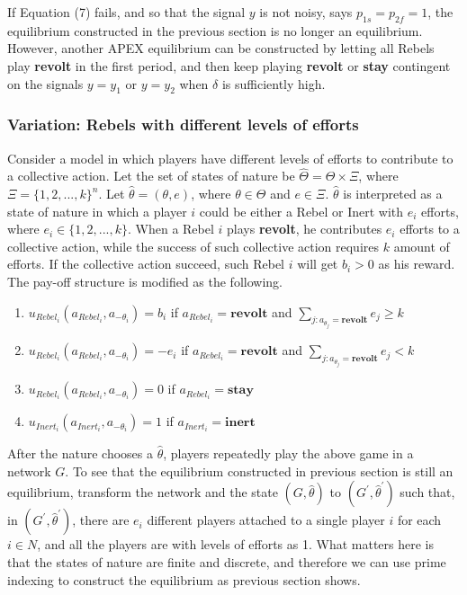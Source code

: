 \documentclass[12pt,letter]{article}
\theoremstyle{definition}
\theoremstyle{remark}
\theoremstyle{claim}
\begin{document}
If Equation (7) fails, and so that the signal $y$ is not noisy, says $p_{1s}=p_{2f}=1$, the equilibrium constructed in the previous section is no longer an equilibrium. However, another APEX equilibrium can be constructed by letting all Rebels play \textbf{revolt} in the first period, and then keep playing \textbf{revolt} or \textbf{stay} contingent on the signals $y=y_1$ or $y=y_2$ when $\delta$ is sufficiently high.

\subsubsection{Variation: Rebels with different levels of efforts}

Consider a model in which players have different levels of efforts to contribute to a collective action. Let the set of states of nature be $\hat{\Theta}=\Theta \times \Xi$, where $\Xi=\{1,2,...,k\}^n$. Let $\hat{\theta}=(\theta,e)$, where $\theta\in \Theta$ and $e\in \Xi$. $\hat{\theta}$ is interpreted as a state of nature in which a player $i$ could be either a Rebel or Inert with $e_i$ efforts, where $e_i\in \{1,2,...,k\}$. When a Rebel $i$ plays \textbf{revolt}, he contributes $e_i$ efforts to a collective action, while the success of such collective action requires $k$ amount of efforts. If the collective action succeed, such Rebel $i$ will get $b_i>0$ as his reward. The pay-off structure is modified as the following.
\begin{enumerate}
\item $u_{Rebel_i}(a_{Rebel_i},a_{-\theta_i})=b_i$ if $a_{Rebel_i}=\textbf{revolt}$ and $\sum_{j:a_{\theta_j}=\textbf{revolt}}e_j\geq k$
\item $u_{Rebel_i}(a_{Rebel_i},a_{-\theta_i})=-e_i$ if $a_{Rebel_i}=\textbf{revolt}$ and $\sum_{j:a_{\theta_j}=\textbf{revolt}}e_j< k$
\item $u_{Rebel_i}(a_{Rebel_i},a_{-\theta_i})=0$ if $a_{Rebel_i}=\textbf{stay}$
\item $u_{Inert_i}(a_{Inert_i},a_{-\theta_i})=1$ if $a_{Inert_i}=\textbf{inert}$
\end{enumerate}

After the nature chooses a $\hat{\theta}$, players repeatedly play the above game in a network $G$. To see that the equilibrium constructed in previous section is still an equilibrium, transform the network and the state $(G,\hat{\theta})$ to $(G^{'},\hat{\theta}^{'})$ such that, in $(G^{'},\hat{\theta}^{'})$, there are $e_i$ different players attached to a single player $i$ for each $i\in N$, and all the players are with levels of efforts as 1. What matters here is that the states of nature are finite and discrete, and therefore we can use prime indexing to construct the equilibrium as previous section shows.
\end{document}
